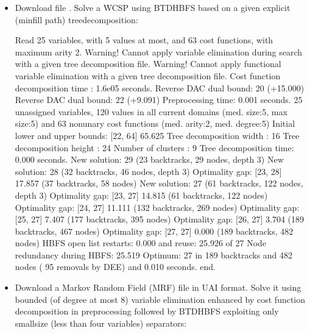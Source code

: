 \documentclass[letterpaper,10pt,openany,oneside,english]{sphinxmanual}
\begin{document}
\begin{itemize}
\item {} 
\sphinxAtStartPar
Download file . Solve a WCSP using BTD\sphinxhyphen{}HBFS based on a given explicit (min\sphinxhyphen{}fill path\sphinxhyphen{}) tree\sphinxhyphen{}decomposition:

\begin{sphinxVerbatim}[commandchars=\\\{\}]
   
\end{sphinxVerbatim}

\begin{sphinxVerbatim}[commandchars=\\\{\}]
Read 25 variables, with 5 values at most, and 63 cost functions, with maximum arity 2.
Warning! Cannot apply variable elimination during search with a given tree decomposition file.
Warning! Cannot apply functional variable elimination with a given tree decomposition file.
Cost function decomposition time : 1.6e\PYGZhy{}05 seconds.
Reverse DAC dual bound: 20 (+15.000\PYGZpc{})
Reverse DAC dual bound: 22 (+9.091\PYGZpc{})
Preprocessing time: 0.001 seconds.
25 unassigned variables, 120 values in all current domains (med. size:5, max size:5) and 63 non\PYGZhy{}unary cost functions (med. arity:2, med. degree:5)
Initial lower and upper bounds: [22, 64] 65.625\PYGZpc{}
Tree decomposition width  : 16
Tree decomposition height : 24
Number of clusters         : 9
Tree decomposition time: 0.000 seconds.
New solution: 29 (23 backtracks, 29 nodes, depth 3)
New solution: 28 (32 backtracks, 46 nodes, depth 3)
Optimality gap: [23, 28] 17.857 \PYGZpc{} (37 backtracks, 58 nodes)
New solution: 27 (61 backtracks, 122 nodes, depth 3)
Optimality gap: [23, 27] 14.815 \PYGZpc{} (61 backtracks, 122 nodes)
Optimality gap: [24, 27] 11.111 \PYGZpc{} (132 backtracks, 269 nodes)
Optimality gap: [25, 27] 7.407 \PYGZpc{} (177 backtracks, 395 nodes)
Optimality gap: [26, 27] 3.704 \PYGZpc{} (189 backtracks, 467 nodes)
Optimality gap: [27, 27] 0.000 \PYGZpc{} (189 backtracks, 482 nodes)
HBFS open list restarts: 0.000 \PYGZpc{} and reuse: 25.926 \PYGZpc{} of 27
Node redundancy during HBFS: 25.519 \PYGZpc{}
Optimum: 27 in 189 backtracks and 482 nodes ( 95 removals by DEE) and 0.010 seconds.
end.
\end{sphinxVerbatim}

\item {} 
\sphinxAtStartPar
Download a Markov Random Field (MRF) file  in UAI format. Solve it using bounded (of degree at most 8) variable elimination enhanced by cost function decomposition in preprocessing  followed by BTD\sphinxhyphen{}HBFS exploiting only small\sphinxhyphen{}size (less than four variables) separators:


\end{itemize}
\end{document}

